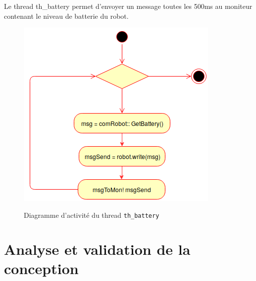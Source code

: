 \documentclass[11pt, a4paper]{paper}
\begin{document}
{Le thread th\_battery permet d'envoyer un message toutes les 500ms au moniteur contenant le niveau de batterie du robot.}

\begin{figure}[htbp]
\label{fig:act_envoyer}
\begin{center}
{\includegraphics[scale=.3]{./dossier_conception/th_battery}}
{\caption{Diagramme d'activité du thread {\tt th\_battery}}}
\end{center}
\end{figure}
\FloatBarrier

\section{Analyse et validation de la conception}
\end{document}
